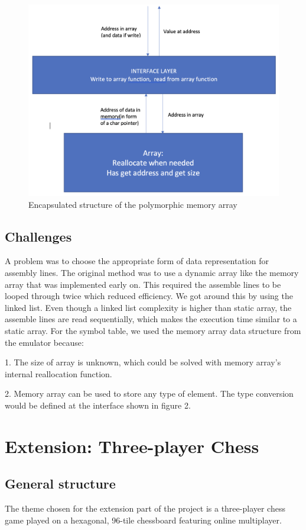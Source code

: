 \documentclass[11pt]{article}
\begin{document}
\begin{figure}
\centering
\begin{minipage}{.5\textwidth}
\centering
\includegraphics[width = \linewidth]{ mem_array }
\caption{Encapsulated structure of the polymorphic memory array}
\end{minipage}\hfill
\end{figure}

\subsection{Challenges}
A problem was to choose the appropriate form of data representation for assembly lines. The original method was to use a dynamic array like the memory array that was implemented early on. This required the assemble lines to be looped through twice which reduced efficiency. We got around this by using the linked list. Even though a linked list complexity is higher than static array, the assemble lines are read sequentially, which makes the execution time similar to a static array.\newline
For the symbol table, we used the memory array data structure from the emulator because:
    
1. The size of array is unknown, which could be solved with memory array's internal reallocation function.
    
2. Memory array can be used to store any type of element. The type conversion would be defined at the interface shown in figure 2.
\pagebreak

\section{Extension: Three-player Chess}
\subsection{General structure}
The theme chosen for the extension part of the project is a three-player chess game played on a hexagonal, 96-tile chessboard featuring online multiplayer.
\end{document}
